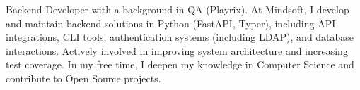 \hspace{0.2in}Backend Developer with a background in QA (Playrix).
At Mindsoft, I develop and maintain backend solutions in Python (FastAPI, Typer),
including API integrations, CLI tools, authentication systems (including LDAP), and database interactions.
Actively involved in improving system architecture and increasing test coverage.
In my free time, I deepen my knowledge in Computer Science and contribute to Open Source projects.